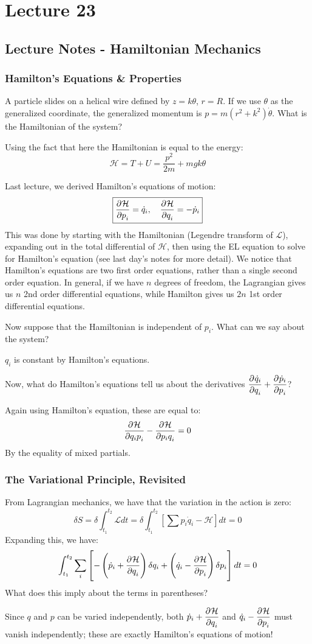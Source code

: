 \section{Lecture 23}
\subsection{Lecture Notes - Hamiltonian Mechanics}
\subsubsection{Hamilton's Equations \& Properties}
A particle slides on a helical wire defined by $z = k\theta$, $r = R$. If we use $\theta$ as the generalized coordinate, the generalized momentum is $p = m(r^2 + k^2)\dot{\theta}$. What is the Hamiltonian of the system?
\begin{s}
    Using the fact that here the Hamiltonian is equal to the energy:
    \[\mathcal{H} = T + U = \frac{p^2}{2m} + mgk\theta\]
\end{s}
Last lecture, we derived Hamilton's equations of motion:
\[\boxed{\dpd{\mathcal{H}}{p_i} = \dot{q}_i, \quad \dpd{\mathcal{H}}{q_i} = - \dot{p}_i}\]
This was done by starting with the Hamiltonian (Legendre transform of $\mathcal{L}$), expanding out in the total differential of $\mathcal{H}$, then using the EL equation to solve for Hamilton's equation (see last day's notes for more detail). We notice that Hamilton's equations are two first order equations, rather than a single second order equation. In general, if we have $n$ degrees of freedom, the Lagrangian gives us $n$ 2nd order differential equations, while Hamilton gives us $2n$ 1st order differential equations. 

\noindent Now suppose that the Hamiltonian is independent of $p_i$. What can we say about the system?
\begin{s}
$q_i$ is constant by Hamilton's equations.
\end{s}

Now, what do Hamilton's equations tell us about the derivatives $\dpd{\dot{q}_i}{q_i} + \dpd{\dot{p}_i}{p_i}$?
\begin{s}
Again using Hamilton's equation, these are equal to:
\[\dpd{\HH}{q_ip_i} - \dpd{\HH}{p_iq_i} = 0\]
By the equality of mixed partials.
\end{s}

\subsubsection{The Variational Principle, Revisited}
From Lagrangian mechanics, we have that the variation in the action is zero:
\[\delta S = \delta \int_{t_1}^{t_2}\mathcal{L}dt = \delta \int_{t_1}^{t_2}[\sum p_i\dot{q}_i - \mathcal{H}]dt = 0\]
Expanding this, we have:
\[\int_{t_1}^{t_2}\sum_i \left[-\left(\dot{p}_i + \dpd{\HH}{q_i}\right)\delta q_i + \left(\dot{q}_i - \dpd{\HH}{p_i}\right)\delta p_i\right] dt = 0\]
What does this imply about the terms in parentheses?
\begin{s}
Since $q$ and $p$ can be varied independently, both $\dot{p}_i + \dpd{\HH}{q_i}$ and $\dot{q}_i - \dpd{\HH}{p_i}$ must vanish independently; these are exactly Hamilton's equations of motion!
\end{s}

